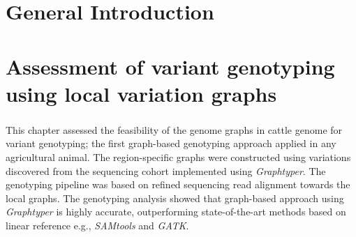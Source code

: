 \documentclass[11 pt, a4paper, notitlepage, twoside]{report}
\begin{document}
\chapter[General Introduction]{\LARGE{General Introduction}}
\label{chap:intro}

\bigskip



\iftwoside
\cleardoublepage
\newpage
\fi


\chapter[Feasibility of the bovine genome graphs]{\LARGE{Assessment of variant genotyping using local variation graphs}}
\label{chap:locgraph}
\subsection*{}
\onehalfspacing
\normalsize
This chapter assessed the feasibility of the genome graphs in cattle genome for variant genotyping; the first graph-based genotyping approach applied in any agricultural animal. The region-specific graphs were constructed using variations discovered from the sequencing cohort implemented using \emph{Graphtyper}. The genotyping pipeline was based on refined sequencing read alignment towards the local graphs. The genotyping analysis showed that graph-based approach using \textit{Graphtyper} is highly accurate, outperforming state-of-the-art methods based on linear reference e.g., \textit{SAMtools} and \emph{GATK}. \\

\bigskip

\end{document}
